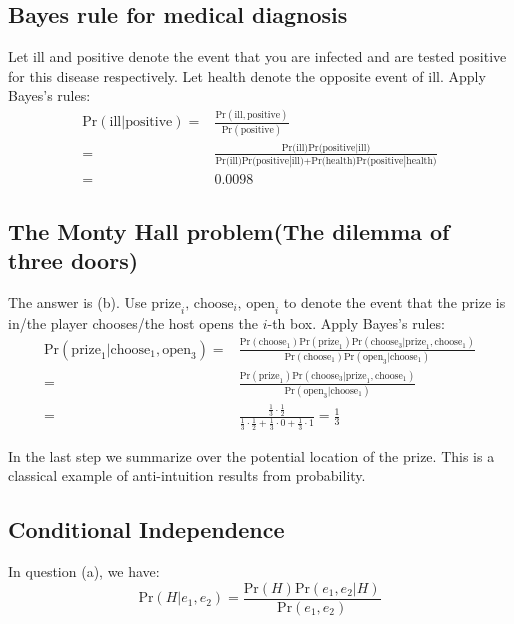 \documentclass[UTF8]{ctexart}
\begin{document}
\subsection{Bayes rule for medical diagnosis}
Let ill and positive denote the event that you are infected and are tested positive for this disease respectively. 
Let health denote the opposite event of ill. 
Apply Bayes's rules:
\begin{align}
\text{Pr}(\text{ill}|\text{positive})=&\frac{\text{Pr}(\text{ill},\text{positive})}{\text{Pr}(\text{positive})}\nonumber \\
=&\frac{\text{Pr(ill)Pr(positive}|\text{ill)}}{\text{Pr(ill)Pr(positive}|\text{ill)+Pr(health)Pr(positive}|\text{health)}} \nonumber \\
=&0.0098 \nonumber
\end{align}

\subsection{The Monty Hall problem(The dilemma of three doors)}
The answer is (b). 
Use $\text{prize}_{i}\text{, }\text{choose}_{i}\text{, }\text{open}_{i}$ to denote the event that the prize is in/the player chooses/the host opens the $i$-th box. 
Apply Bayes's rules:
\begin{align}
\text{Pr}(\text{prize}_{1}|\text{choose}_{1},\text{open}_{3})=&\frac{\text{Pr}(\text{choose}_{1})\text{Pr}(\text{prize}_{1})\text{Pr}(\text{choose}_{3}|\text{prize}_{1},\text{choose}_{1})}{\text{Pr}(\text{choose}_{1})\text{Pr}(\text{open}_{3}|\text{choose}_{1})}\nonumber \\
=&\frac{\text{Pr}(\text{prize}_{1})\text{Pr}(\text{choose}_{3}|\text{prize}_{1},\text{choose}_{1})}{\text{Pr}(\text{open}_{3}|\text{choose}_{1})}\nonumber \\
=&\frac{\frac{1}{3}\cdot\frac{1}{2}}{\frac{1}{3}\cdot \frac{1}{2} + \frac{1}{3}\cdot 0 + \frac{1}{3} \cdot 1}=\frac{1}{3} \nonumber
\end{align}

In the last step we summarize over the potential location of the prize.
This is a classical example of anti-intuition results from probability. 


\subsection{Conditional Independence}
In question (a), we have:
$$\text{Pr}(H|e_{1},e_{2})=\frac{\text{Pr}(H)\text{Pr}(e_{1},e_{2}|H)}{\text{Pr}(e_{1},e_{2})}$$
\end{document}
